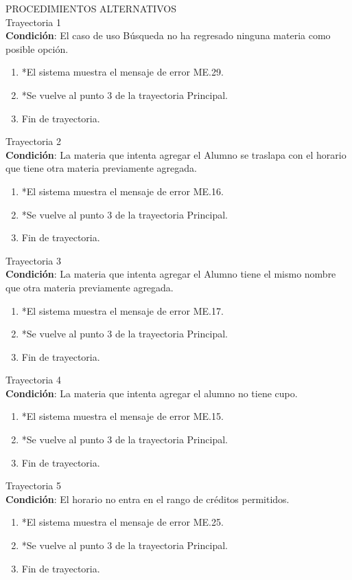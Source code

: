 \Large{PROCEDIMIENTOS ALTERNATIVOS}\\
\large{Trayectoria 1}\\
\textbf{Condición}: El caso de uso Búsqueda no ha regresado ninguna materia como posible opción.
\begin{enumerate}
	\item *El sistema muestra el mensaje de error ME.29.
	\item *Se vuelve al punto 3 de la trayectoria Principal.
	\item Fin de trayectoria.
\end{enumerate}
\large{Trayectoria 2}\\
\textbf{Condición}: La materia que intenta agregar el Alumno se traslapa con el horario que tiene otra materia previamente agregada.
\begin{enumerate}
	\item *El sistema muestra el mensaje de error ME.16.
	\item *Se vuelve al punto 3 de la trayectoria Principal.
	\item Fin de trayectoria.
\end{enumerate}
\large{Trayectoria 3}\\
\textbf{Condición}: La materia que intenta agregar el Alumno tiene el mismo nombre que otra materia previamente agregada.
\begin{enumerate}
	\item *El sistema muestra el mensaje de error ME.17.
	\item *Se vuelve al punto 3 de la trayectoria Principal.
	\item Fin de trayectoria.
\end{enumerate}
\large{Trayectoria 4}\\
\textbf{Condición}: La materia que intenta agregar el alumno no tiene cupo.
\begin{enumerate}
	\item *El sistema muestra el mensaje de error ME.15.
	\item *Se vuelve al punto 3 de la trayectoria Principal.
	\item Fin de trayectoria.
\end{enumerate}
\large{Trayectoria 5}\\
\textbf{Condición}: El horario no entra en el rango de créditos permitidos.
\begin{enumerate}
	\item *El sistema muestra el mensaje de error ME.25.
	\item *Se vuelve al punto 3 de la trayectoria Principal.
	\item Fin de trayectoria.
\end{enumerate}